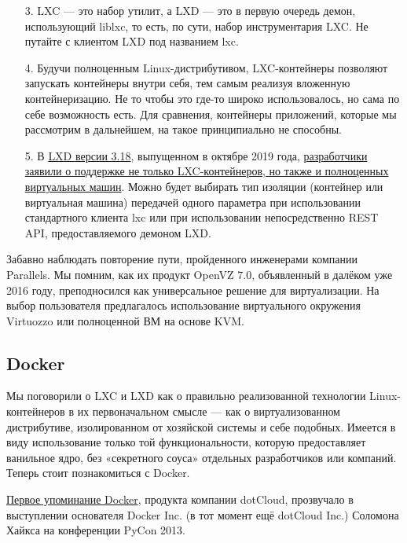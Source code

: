 \documentclass[14pt, a4paper]{article}
\begin{document}
\begin{enumerate}
    \item [3.]LXC — это набор утилит, а LXD — это в первую очередь демон, использующий liblxc, то есть,
    по сути, набор инструментария LXC. Не путайте с клиентом LXD под названием lxc.
    \item [4.]Будучи полноценным Linux-дистрибутивом, LXC-контейнеры позволяют запускать контейнеры
    внутри себя, тем самым реализуя вложенную контейнеризацию. Не то чтобы это где-то
    широко использовалось, но сама по себе возможность есть. Для сравнения, контейнеры
    приложений, которые мы рассмотрим в дальнейшем, на такое принципиально не способны.
    \item [5.]В \href{https://discuss.linuxcontainers.org/t/lxd-3-18-has-been-released/5869}{LXD версии 3.18}, выпущенном в октябре 2019 года, \href{https://github.com/lxc/lxd/issues/6205}{разработчики заявили о поддержке не
    только LXC-контейнеров, но также и полноценных виртуальных машин}. Можно будет выбирать
    тип изоляции (контейнер или виртуальная машина) передачей одного параметра при
    использовании стандартного клиента lxc или при использовании непосредственно REST API,
    предоставляемого демоном LXD.
\end{enumerate}

Забавно наблюдать повторение пути, пройденного инженерами компании Parallels. Мы помним, как их
продукт OpenVZ 7.0, объявленный в далёком уже 2016 году, преподносился как универсальное
решение для виртуализации. На выбор пользователя предлагалось использование виртуального
окружения Virtuozzo или полноценной ВМ на основе KVM.\\


\subsection*{Docker}

Мы поговорили о LXC и LXD как о правильно реализованной технологии Linux-контейнеров в их
первоначальном смысле — как о виртуализованном дистрибутиве, изолированном от хозяйской
системы и себе подобных. Имеется в виду использование только той функциональности, которую
предоставляет ванильное ядро, без «секретного соуса» отдельных разработчиков или компаний.
Теперь стоит познакомиться с Docker.

\href{https://www.youtube.com/watch?v=wW9CAH9nSLs}{Первое упоминание Docker}, продукта компании dotCloud, прозвучало в выступлении основателя
Docker Inc. (в тот момент ещё dotCloud Inc.) Соломона Хайкса на конференции PyCon 2013.
\end{document}
